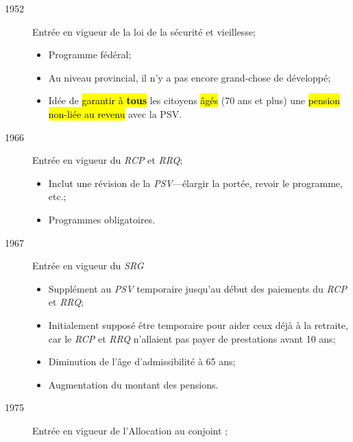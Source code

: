 \documentclass[10pt, french]{article}
\begin{document}
\begin{multicols*}{3}
\begin{rappel_enhanced}[Historique]
\begin{description}
	\item[1952]	Entrée en vigueur de la loi de la sécurité et vieillesse;
		\begin{itemize}[leftmargin = *]
		\item	Programme \textcolor{bulgarianrose}{fédéral};
		\item	Au niveau \textcolor{blue(pigment)}{provincial}, il n'y a pas encore grand-chose de développé;
		\item	Idée de \hl{garantir à \textbf{tous}} les citoyens \hl{âgés} (70 ans et plus) une \hl{pension non-liée au revenu} avec la PSV.
		\end{itemize}
	\item[1966]	Entrée en vigueur du \textit{RCP} et \textit{RRQ};
		\begin{itemize}[leftmargin = *]
		\item	Inclut une révision de la \textit{PSV}---élargir la portée, revoir le programme, etc.;
		\item	Programmes obligatoires.	
		\end{itemize}
	\item[1967]	Entrée en vigueur du \textit{SRG}
		\begin{itemize}[leftmargin = *]
		\item	Supplément au \textit{PSV} temporaire jusqu'au début des paiements du \textit{RCP} et \textit{RRQ};
		\item	Initialement supposé être temporaire pour aider ceux déjà à la retraite, car le \textit{RCP} et \textit{RRQ} n'allaient pas payer de prestations avant 10 ans;
		\item	Diminution de l'âge d'admissibilité à 65 ans;
		\item	Augmentation du montant des pensions.
		\end{itemize}
	\item[1975]	Entrée en vigueur de l'Allocation au conjoint ;

\end{description}
\end{rappel_enhanced}
\end{multicols*}
\end{document}
